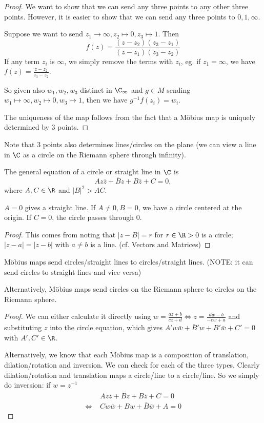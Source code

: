 \documentclass[a4paper]{article}
\begin{document}
\begin{proof}
  We want to show that we can send any three points to any other three points. However, it is easier to show that we can send any three points to $0, 1, \infty$.

  Suppose we want to send $z_1\to \infty, z_2\mapsto 0, z_3 \mapsto 1$. Then
  \[
    f(z) = \frac{(z - z_2)(z_3 - z_1)}{(z - z_1)(z_3 - z_2)}
  \]
  If any term $z_i$ is $\infty$, we simply remove the terms with $z_i$, eg. if $z_1 = \infty$, we have $f(z) = \frac{z - z_2}{z_3 - z_2}$.

  So given also $w_1, w_2, w_3$ distinct in $\C_\infty$ and $g\in M$ sending $w_1\mapsto \infty, w_2\mapsto 0, w_3\mapsto 1$, then we have $g^{-1}f(z_i) = w_i$.

  The uniqueness of the map follows from the fact that a M\"obius map is uniquely determined by 3 points.
\end{proof}

Note that 3 points also determines lines/circles on the plane (we can view a line in $\C$ as a circle on the Riemann sphere through infinity).

\begin{lemma}
  The general equation of a circle or straight line in $\C$ is
  \[
    Az\bar z + \bar Bz + B\bar z + C = 0,
  \]
  where $A, C\in \R$ and $|B|^2 > AC$.
\end{lemma}
\note $A = 0$ gives a straight line. If $A \not= 0, B = 0$, we have a circle centered at the origin. If $C = 0$, the circle passes through 0.

\begin{proof}
  This comes from noting that $|z - B| = r$ for $r \in \R> 0$ is a circle; $|z - a| = |z - b|$ with $a\not= b $ is a line. (cf. Vectors and Matrices)
\end{proof}

\begin{prop}
  M\"obius maps send circles/straight lines to circles/straight lines. (NOTE: it can send circles to straight lines and vice versa)

  Alternatively, M\"obius maps send circles on the Riemann sphere to circles on the Riemann sphere.
\end{prop}

\begin{proof}
  We can either calculate it directly using $w = \frac{az + b}{cz + d}\Leftrightarrow z = \frac{dw - b}{-cw + a}$ and substituting $z$ into the circle equation, which gives $A' w\bar w + \bar B' w + B'\bar w + C' = 0$ with $A', C'\in \R$.

  Alternatively, we know that each M\"obius map is a composition of translation, dilation/rotation and inversion. We can check for each of the three types. Clearly dilation/rotation and translation maps a circle/line to a circle/line. So we simply do inversion: if $w = z^{-1}$
  \begin{align*}
    &\; Az\bar z + \bar Bz + B\bar z + C = 0\\
    \Leftrightarrow &\;  Cw\bar w + Bw + \bar B\bar w + A = 0
  \end{align*}
\end{proof}
\end{document}

